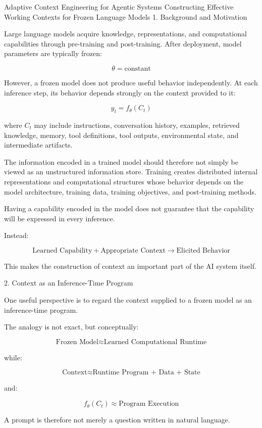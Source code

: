 Adaptive Context Engineering for Agentic Systems
Constructing Effective Working Contexts for Frozen Language Models
1. Background and Motivation

Large language models acquire knowledge, representations, and computational capabilities through pre-training and post-training. After deployment, model parameters are typically frozen:

$$ \theta=\text{constant} $$

However, a frozen model does not produce useful behavior independently. At each inference step, its behavior depends strongly on the context provided to it:

$$ y_t=f_\theta(C_t) $$

where \(C_t\) may include instructions, conversation history, examples, retrieved knowledge, memory, tool definitions, tool outputs, environmental state, and intermediate artifacts.

The information encoded in a trained model should therefore not simply be viewed as an unstructured information store. Training creates distributed internal representations and computational structures whose behavior depends on the model architecture, training data, training objectives, and post-training methods.

Having a capability encoded in the model does not guarantee that the capability will be expressed in every inference.

Instead:

$$ \boxed{ \text{Learned Capability} + \text{Appropriate Context} \rightarrow \text{Elicited Behavior} } $$

This makes the construction of context an important part of the AI system itself.

2. Context as an Inference-Time Program

One useful perspective is to regard the context supplied to a frozen model as an inference-time program.

The analogy is not exact, but conceptually:

$$ \text{Frozen Model} \approx \text{Learned Computational Runtime} $$

while:

$$ \text{Context} \approx \text{Runtime Program + Data + State} $$

and:

$$ f_\theta(C_t) \approx \text{Program Execution} $$

A prompt is therefore not merely a question written in natural language.

